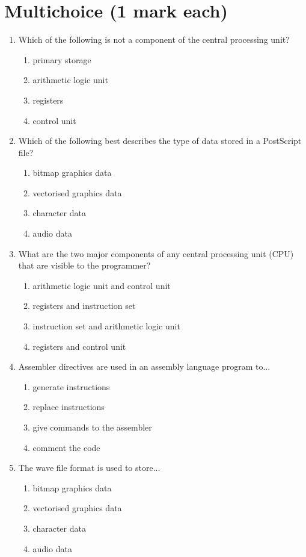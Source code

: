 \documentclass[a4paper,10pt]{article}
\begin{document}
\section{Multichoice (1 mark each)}
\begin{enumerate}

\item Which of the following is not a component of the central
processing unit?
\begin{enumerate}
 \item primary storage 
 \item arithmetic logic unit
 \item registers
 \item control unit
\end{enumerate}

\item Which of the following best describes the type of data stored in a
PostScript file? 
\begin{enumerate}
  \item bitmap graphics data
  \item vectorised graphics data
  \item character data
  \item audio data
\end{enumerate}

\item What are the two major components of any central processing unit
(CPU) that are visible to the programmer? 
\begin{enumerate}
  \item arithmetic logic unit and control unit
  \item registers and instruction set
  \item instruction set and arithmetic logic unit 
  \item registers and control unit
\end{enumerate}

\item Assembler directives are used in an assembly language program to...
\begin{enumerate}
  \item generate instructions
  \item replace instructions
  \item give commands to the assembler
  \item comment the code
\end{enumerate}

\newpage
\item The wave file format is used to store...
\begin{enumerate}
  \item bitmap graphics data
  \item vectorised graphics data
  \item character data
  \item audio data
\end{enumerate}


\end{enumerate}
\end{document}
